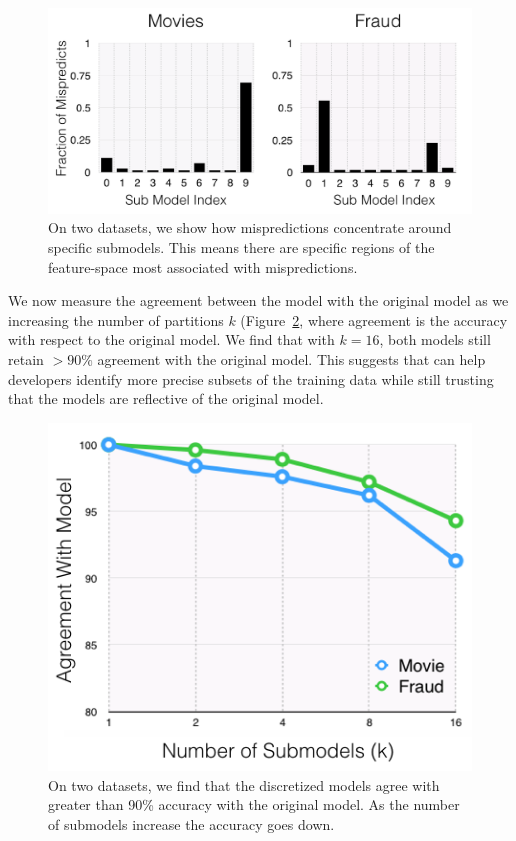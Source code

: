 \begin{figure}[ht]
    \centering
    \includegraphics[width=\columnwidth]{figures/concentration.png}
    \caption{On two datasets, we show how mispredictions concentrate around specific submodels. This means there are specific regions of the feature-space most associated with mispredictions.}
    \label{fig:concentrate}
\end{figure}

We now measure the agreement between the \sys model with the original model as we increasing the number of partitions $k$ (Figure~\ref{fig:agreement}, where agreement is the accuracy with respect to the original model.
We find that with $k=16$, both \sys models still retain $>90\%$ agreement with the original model.
This suggests that \sys can help developers identify more precise subsets of the training data while still trusting that the \sys models are reflective of the original model.

\begin{figure}[ht]
    \centering
    \includegraphics[width=0.6\columnwidth]{figures/agreement.png}
    \caption{On two datasets, we find that the discretized models agree with greater than 90\% accuracy with the original model. As the number of submodels increase the accuracy goes down.}
    \label{fig:agreement}
\end{figure}


